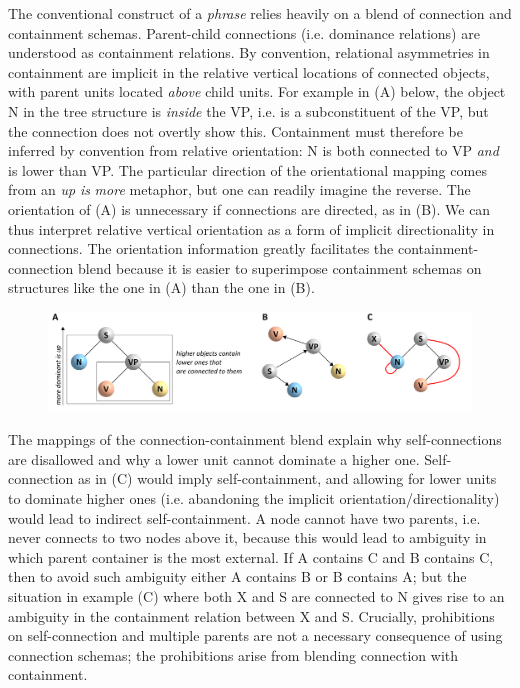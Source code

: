   The conventional construct of a \textit{phrase} relies heavily on a blend of connection and containment schemas. Parent-child connections (i.e. dominance relations) are understood as containment relations. By convention, relational asymmetries in containment are implicit in the relative vertical locations of connected objects, with parent units located \textit{above} child units. For example in (A) below, the object N in the tree structure is \textit{inside} the VP, i.e. is a subconstituent of the VP, but the connection does not overtly show this. Containment must therefore be inferred by convention from relative orientation: N is both connected to VP \textit{and} is lower than VP. The particular direction of the orientational mapping comes from an \textit{up} \textit{is} \textit{more} metaphor, but one can readily imagine the reverse. The orientation of (A) is unnecessary if connections are directed, as in (B). We can thus interpret relative vertical orientation as a form of implicit directionality in connections. The orientation information greatly facilitates the containment-connection blend because it is easier to superimpose containment schemas on structures like the one in (A) than the one in (B). 

  
\begin{figure}
\includegraphics[width=\textwidth]{figures/Tilsen-img35.png}
\caption{\missingcaption}
\label{fig:}
\end{figure}
 

  The mappings of the connection-containment blend explain why self-connections are disallowed and why a lower unit cannot dominate a higher one. Self-connection as in (C) would imply self-containment, and allowing for lower units to dominate higher ones (i.e. abandoning the implicit orientation/directionality) would lead to indirect self-containment. A node cannot have two parents, i.e. never connects to two nodes above it, because this would lead to ambiguity in which parent container is the most external. If A contains C and B contains C, then to avoid such ambiguity either A contains B or B contains A; but the situation in example (C) where both X and S are connected to N gives rise to an ambiguity in the containment relation between X and S. Crucially, prohibitions on self-connection and multiple parents are not a necessary consequence of using connection schemas; the prohibitions arise from blending connection with containment.

